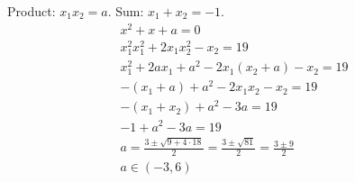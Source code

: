 Product: $x_{1}x_{2}=a$. 
Sum: $x_{1}+x_{2}=-1$. 
\begin{align*}
x^{2} + x + a = 0
\\
x_{1}^{2}x_{1}^{2} + 2x_{1}x_{2}^{2} - x_{2} = 19
\\
x_{1}^{2} + 2ax_{1} + a^{2} - 2x_{1}(x_{2}+a) - x_{2} = 19
\\
-(x_{1}+a) + a^{2} - 2x_{1}x_{2} - x_{2} = 19
\\
- (x_{1} + x_{2}) + a^{2} - 3a = 19
\\
- 1 + a^{2} - 3a = 19
\\
a = \frac{3 \pm \sqrt{9 + 4 \cdot 18}}{2}
  = \frac{3 \pm \sqrt{81}}{2}
  = \frac{3 \pm 9}{2}
\\
a \in (-3, 6)
\end{align*}
